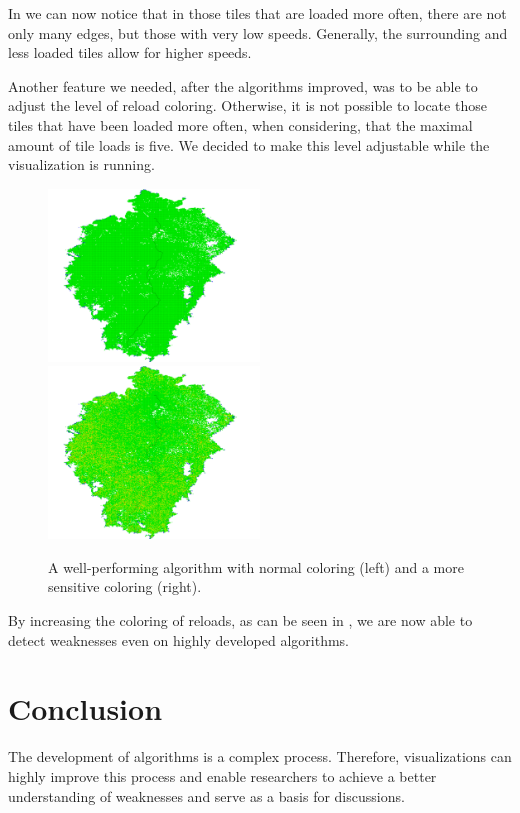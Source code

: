 \documentclass
[
    paper = a4,
    pagesize,
    12 pt,
    twoside,                       %
    open = right,
    DIV = calc,
    BCOR = 0 mm,                   %
    bibtotoc
]
{scrbook}
\begin{document}
In  we can now notice that in those tiles that are loaded more often, there are not only many edges, but those with very low speeds.
Generally, the surrounding and less loaded tiles allow for higher speeds.

Another feature we needed, after the algorithms improved, was to be able to adjust the level of reload coloring.
Otherwise, it is not possible to locate those tiles that have been loaded more often, when considering, that the maximal amount of tile loads is five.
We decided to make this level adjustable while the visualization is running.

\begin{figure}
    \includegraphics[width=0.5\textwidth]{Images/vis-no-factor.png}
  \includegraphics[width=0.5\textwidth]{Images/vis-factor.png}
\caption[]{A well-performing algorithm with normal coloring (left) and a more sensitive coloring (right).}
\label{fig:factor}
\end{figure}

By increasing the coloring of reloads, as can be seen in , we are now able to detect weaknesses even on highly developed algorithms.

\chapter{Conclusion} \label{conclusion}

The development of algorithms is a complex process.
Therefore, visualizations can highly improve this process and enable researchers to achieve a better understanding of weaknesses and serve as a basis for discussions.
\end{document}
